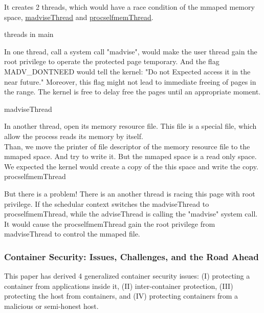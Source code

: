 \documentclass[12pt,a4paper]{IEEEconf}
\begin{document}
It creates 2 threads, which would have a race condition of the mmaped memory space,
\hyperlink{madvise}{madviseThread} and \hyperlink{procself}{procselfmemThread}.

\hypertarget{threads_main}{threads in main}


In one thread, call a system call "madvise", would make the user thread gain the root
privilege to operate the protected page temporary. And the flag MADV\_DONTNEED would
tell the kernel: "Do not Expected access it in the near future.\cite{Madvise}" Moreover,
this flag might not lead to immediate freeing of pages in the range. The kernel is free
to delay free the pages until an appropriate moment.\cite{Madvise}

\hypertarget{madvise}{madviseThread}


In another thread, open its memory resource file. This file is a special file, which allow
the process reads its memory by itself.\\
Than, we move the printer of file descriptor of the memory resource file to the mmaped
space. And try to write it. But the mmaped space is a read only space. We expected the
kernel would create a copy of the this space and write the copy\cite{root_exploit}.\\
\hypertarget{procself}{procselfmemThread}


But there is a problem! There is an another thread is racing this page with root privilege.
If the schedular context switches the madviseThread to procselfmemThread, while the
adviseThread is calling the "madvise" system call. It would cause the procselfmemThread
gain the root privilege from madviseThread to control the mmaped file.

\subsubsection{Container Security: Issues, Challenges, and the Road Ahead}
This paper\cite{Road_Ahead} has derived 4 generalized container security issues:
(\RN{1}) protecting a container from applications inside it, (\RN{2}) inter-container
protection, (\RN{3}) protecting the host from containers, and (\RN{4}) protecting containers
from a malicious or semi-honest host.\cite{Road_Ahead}
\end{document}
